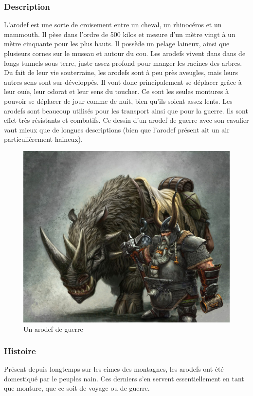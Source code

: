 \subsubsection{Description}
L’arodef est une sorte de croisement entre un cheval, un rhinocéros et un mammouth. Il pèse dans l’ordre de 500 kilos et mesure d’un mètre vingt à un mètre cinquante pour les plus hauts. Il possède un pelage laineux, ainsi que plusieurs cornes sur le museau et autour du cou. Les arodefs vivent dans dans de longs tunnels sous terre, juste assez profond pour manger les racines des arbres. Du fait de leur vie souterraine, les arodefs sont à peu près aveugles, mais leurs autres sens sont sur-développés. Il vont donc principalement se déplacer grâce à leur ouïe, leur odorat et leur sens du toucher. Ce sont les seules montures à pouvoir se déplacer de jour comme de nuit, bien qu’ils soient assez lents. Les arodefs sont beaucoup utilisés pour les transport ainsi que pour la guerre. Ils sont effet très résistants et combatifs. Ce dessin d’un arodef de guerre avec son cavalier vaut mieux que de longues descriptions (bien que l’arodef présent ait un air particulièrement haineux). 
\begin{figure}[ht]
\begin{center}
   \includegraphics[scale=1.2]{./Ressources/medieval/arodef.jpg}
   \caption{Un arodef de guerre}
\end{center}
\end{figure}
\subsubsection{Histoire}
Présent depuis longtemps sur les cimes des montagnes, les arodefs ont été domestiqué par le peuples nain. Ces derniers s’en servent essentiellement en tant que monture, que ce soit de voyage ou de guerre. 
